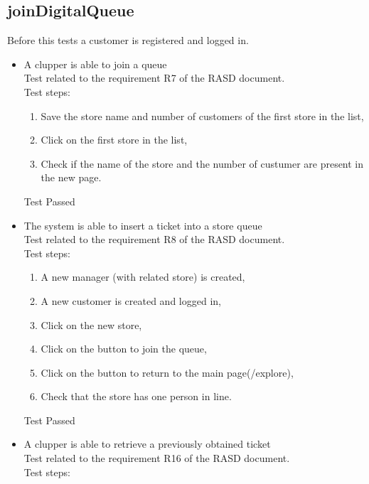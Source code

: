 \subsection{joinDigitalQueue}

Before this tests a customer is registered and logged in.

\begin{itemize}
    \item A clupper is able to join a queue \\
    Test related to the requirement R7 of the RASD document. \\
    Test steps:\\

    \begin{enumerate}
        \item Save the store name and number of customers of the first store in the list,
        \item Click on the first store in the list,
        \item Check if the name of the store and the number of custumer are present in the new page.
    \end{enumerate}
    Test Passed

    \item The system is able to insert a ticket into a store queue \\
    Test related to the requirement R8 of the RASD document. \\
    Test steps: \\
    \begin{enumerate}

        \item A new manager (with related store) is created,

        \item A new customer is created and logged in,

        \item Click on the new store,

        \item Click on the button to join the queue,

        \item Click on the button to return to the main page(/explore),

        \item Check that the store has one person in line.
    \end{enumerate}
    Test Passed

    \item A clupper is able to retrieve a previously obtained ticket \\
    Test related to the requirement R16 of the RASD document. \\
    Test steps: \\
    \begin{enumerate}


\end{enumerate}
\end{itemize}
